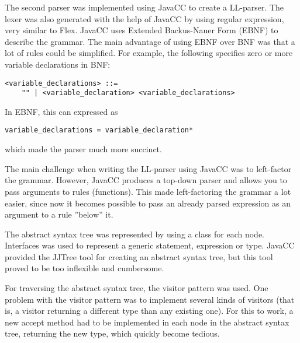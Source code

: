 \documentclass[11pt,oneside,a4paper]{article}
\begin{document}
The second parser was implemented using JavaCC to create a LL-parser. The lexer
was also generated with the help of JavaCC by using regular expression, very
similar to Flex. JavaCC uses Extended Backus-Nauer Form (EBNF) to describe the
grammar. The main advantage of using EBNF over BNF was that a lot of rules
could be simplified. For example, the following specifies zero or more variable
declarations in BNF:
\begin{verbatim}
<variable_declarations> ::= 
    "" | <variable_declaration> <variable_declarations>
\end{verbatim}
In EBNF, this can expressed as 
\begin{verbatim}
variable_declarations = variable_declaration*
\end{verbatim} 
which made the parser much more succinct.

The main challenge when writing the LL-parser using JavaCC was to left-factor
the grammar. However, JavaCC produces a top-down parser and allows you to
pass arguments to rules (functions). 
This made left-factoring the grammar  a lot easier, since now it becomes 
possible to pass an already parsed expression as an argument to a 
rule ''below'' it.

The abstract syntax tree was represented by using a class for each node.
Interfaces was used to represent a generic statement, expression or type.
JavaCC provided the JJTree tool for creating an abstract syntax tree, but this
tool proved to be too inflexible and cumbersome. 

For traversing the abstract syntax tree, the visitor pattern was used. 
One problem with the visitor pattern was to implement several kinds of 
visitors (that is, a visitor returning a different type than any existing one). 
For this to work, a new accept method had to be implemented in each node in 
the abstract syntax tree, returning the new type, which quickly become tedious.
\end{document}
